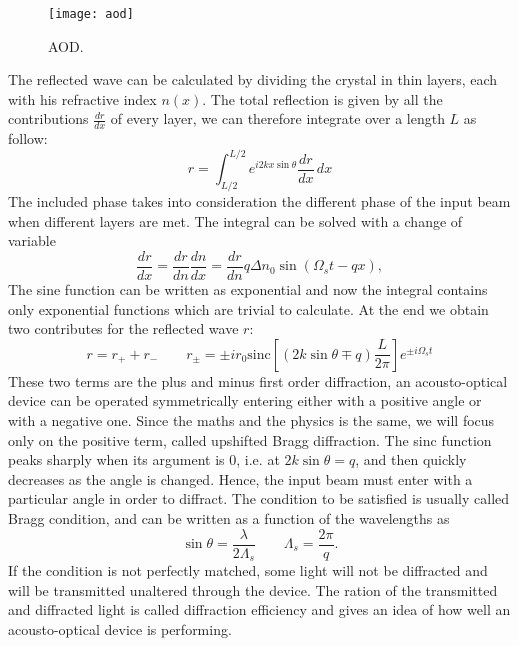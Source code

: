 \begin{figure}[H]
\centering
\texttt{[image: aod]}
\caption{AOD.}
\label{AOD}
\end{figure}
The reflected wave can be calculated by dividing the crystal in thin layers, each with his refractive index $n(x)$. The total reflection is given by all the contributions $\frac{dr}{dx}$ of every layer, we can therefore integrate over a length $L$ as follow:
\begin{equation}
r = \int_{L/2}^{L/2} e^{i2kx \sin\theta} \frac{dr}{dx} \,dx
\end{equation}
The included phase takes into consideration the different phase of the input beam when different layers are met. The integral can be solved with a change of variable
\begin{equation}
\frac{dr}{dx} = \frac{dr}{dn}\frac{dn}{dx} = \frac{dr}{dn} q \Delta n_0 \sin \left(\Omega_s t - qx \right),
\end{equation}
The sine function can be written as exponential and now the integral contains only exponential functions which are trivial to calculate. At the end we obtain two contributes for the reflected wave $r$:
\begin{equation}
\label{mainAOD}
r = r_+ + r_- \qquad r_\pm = \pm i r_0 \text{sinc} \left[(2k\sin\theta \mp q)\frac{L}{2\pi} \right]e^{\pm i\Omega_s t}
\end{equation}
These two terms are the plus and minus first order diffraction, an acousto-optical device can be operated symmetrically entering either with a positive angle or with a negative one. Since the maths and the physics is the same, we will focus only on the positive term, called upshifted Bragg diffraction. The sinc function peaks sharply when its argument is 0, i.e. at $2k\sin\theta = q$, and then quickly decreases as the angle is changed. Hence, the input beam must enter with a particular angle in order to diffract. The condition to be satisfied is usually called Bragg condition, and can be written as a function of the wavelengths as
\begin{equation}
\label{braggcondition}
\sin \theta  = \frac{\lambda}{2 \Lambda_s} \qquad \Lambda_s = \frac{2\pi}{q}.
\end{equation}
If the condition is not perfectly matched, some light will not be diffracted and will be transmitted unaltered through the device.
The ration of the transmitted and diffracted light is called diffraction efficiency and gives an idea of how well an acousto-optical device is performing.\\
